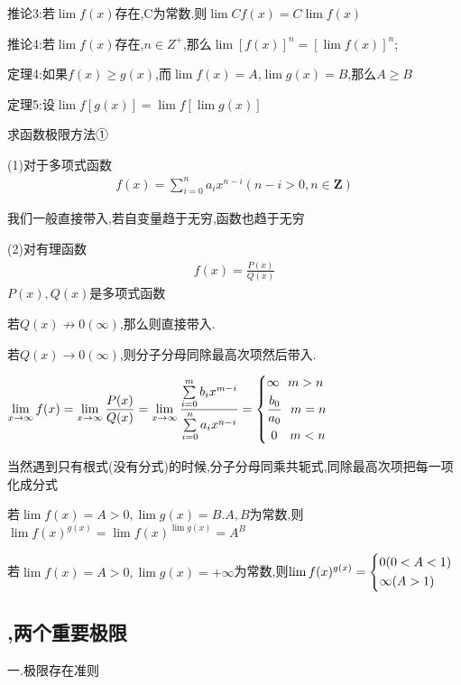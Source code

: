 \documentclass[utf8]{ctexart}
\begin{document}
推论3:若$\lim f(x)$存在,C为常数.则$\lim Cf(x)=C\lim f(x)$

推论4:若$\lim f(x)$存在,$n \in Z^+$,那么$\lim \left[f(x)\right]^n=\left[\lim f(x)\right]^n$;

定理4:如果$f(x)\geqslant g(x)$,而$\lim f(x)=A$,$\lim g(x)=B$,那么$A\geqslant B$

定理5:设$\lim f\left[g(x)\right]=\lim f\left[\lim g(x)\right]$

求函数极限方法①

(1)对于多项式函数
\begin{align*}
    f(x)=\sum \limits_{i=0}^{n} a_{i}x^{n-i}(n-i>0,n\in \mathbf{Z} )
\end{align*}

我们一般直接带入,若自变量趋于无穷,函数也趋于无穷

(2)对有理函数
\begin{align*}
    \displaystyle f(x)=\frac{P(x)}{Q(x)}
\end{align*}
$P(x),Q(x)$是多项式函数

若$Q(x)\nrightarrow  0(\infty )$,那么则直接带入.

若$Q(x)\rightarrow  0(\infty )$,则分子分母同除最高次项然后带入.

$\displaystyle \lim\limits_{x\to \infty }f(x)=\lim\limits_{x\to \infty }\frac{P(x)}{Q(x)}=\lim\limits_{x\to \infty }\displaystyle \frac{\sum \limits_{i=0}^{m} b_{i}x^{m-i}}{\sum \limits_{i=0}^{n} a_{i}x^{n-i}}=
\begin{dcases}
    \infty  \ \ m>n\\
    \displaystyle\frac{b_{0}}{a_{0}}\ \ m=n\\
    \ 0  \ \ \ m<n
\end{dcases}$

当然遇到只有根式(没有分式)的时候,分子分母同乘共轭式,同除最高次项把每一项化成分式

若$\lim f(x)=A>0,\lim g(x)=B.A,B$为常数,则$\displaystyle\lim f(x)^{g(x)}=\lim f(x)^{\lim g(x)}=A^{B}$

若$\lim f(x)=A>0,\lim g(x)=+\infty$为常数,则$\displaystyle\lim f(x)^{g(x)}=
\begin{dcases}
0(0<A<1) \\ \infty(A>1)   
\end{dcases}$

\subsection{,两个重要极限}
一.极限存在准则
\end{document}
